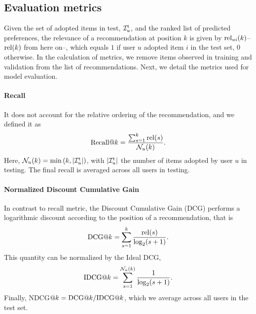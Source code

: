 
\subsection{Evaluation metrics}\label{subsec:metrics}
\setlength{\belowcaptionskip}{-10pt}
Given the set of adopted items in test, $\mathcal{I}_u^{\rm t}$, and the ranked list of predicted preferences, 
the relevance of a recommendation at position $k$ is given by ${\rm rel}_{ui}(k)$--${\rm rel}(k)$ from here on--, which equals $1$ if user $u$ adopted item $i$ in the test set, $0$ otherwise. In the calculation of metrics, we remove items observed in  training and validation from the list of recommendations. 
Next, we detail the metrics used for model evaluation.

\paragraph{Recall} It does not account for the relative ordering of the recommendation, and we defined it as~\cite{liang:2018:VAE}
\begin{equation}
{\rm Recall}@k = \frac{\sum_{s=1}^k {\rm rel}(s)}
{\mathcal{N}_u(k)}.
\end{equation}
Here, $\mathcal{N}_u(k) = \min\left(k,|\mathcal{I}_u^{\rm t}|\right)$, with $|\mathcal{I}_u^{\rm t}|$ the number of items adopted by user $u$ in testing. The final recall is averaged across all users in testing. 

\paragraph{Normalized Discount Cumulative Gain} In contrast to recall metric, the Discount Cumulative Gain (DCG) performs a logarithmic discount according to the position of a recommendation, that is
\begin{equation}
{\rm DCG}@k = \sum_{s=1}^k \frac{{\rm rel}(s)}
{\log_2(s+1)}.
\end{equation}
This quantity can be normalized by the Ideal DCG, 
\begin{equation}
{\rm IDCG}@k = \sum_{s=1}^{\mathcal{N}_u(k)} \frac{1}{\log_2(s+1)}.
\end{equation}
Finally, NDCG$@k= {\rm DCG}@k/{\rm IDCG}@k$, which we average across all users in the test set.

